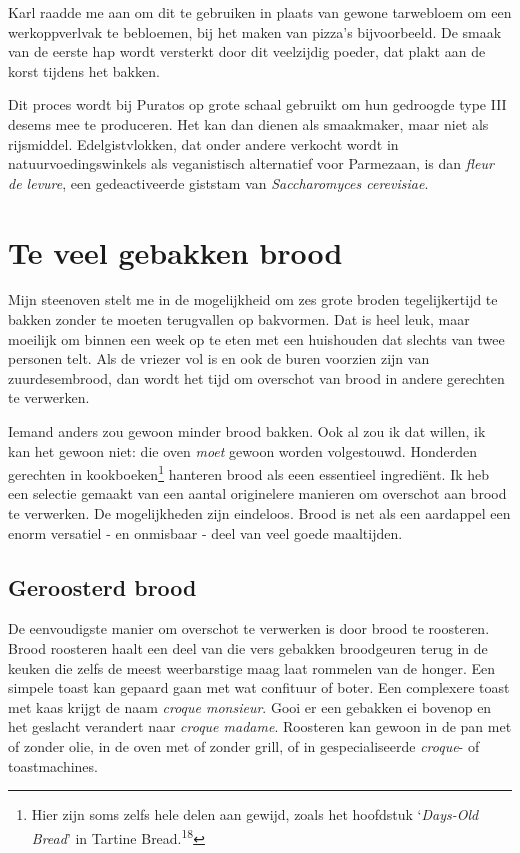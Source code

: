 \documentclass[
  11pt,
  dutch,
]{memoir}
\begin{document}
Karl raadde me aan om dit te gebruiken in plaats van gewone tarwebloem
om een werkoppverlvak te bebloemen, bij het maken van pizza's
bijvoorbeeld. De smaak van de eerste hap wordt versterkt door dit
veelzijdig poeder, dat plakt aan de korst tijdens het bakken.

Dit proces wordt bij Puratos op grote schaal gebruikt om hun gedroogde
type III desems mee te produceren. Het kan dan dienen als smaakmaker,
maar niet als rijsmiddel. Edelgistvlokken, dat onder andere verkocht
wordt in natuurvoedingswinkels als veganistisch alternatief voor
Parmezaan, is dan \emph{fleur de levure}, een gedeactiveerde giststam
van \emph{Saccharomyces cerevisiae}.

\hypertarget{te-veel-gebakken-brood}{%
\section{Te veel gebakken brood}\label{te-veel-gebakken-brood}}

Mijn steenoven stelt me in de mogelijkheid om zes grote broden
tegelijkertijd te bakken zonder te moeten terugvallen op bakvormen. Dat
is heel leuk, maar moeilijk om binnen een week op te eten met een
huishouden dat slechts van twee personen telt. Als de vriezer vol is en
ook de buren voorzien zijn van zuurdesembrood, dan wordt het tijd om
overschot van brood in andere gerechten te verwerken.

Iemand anders zou gewoon minder brood bakken. Ook al zou ik dat willen,
ik kan het gewoon niet: die oven \emph{moet} gewoon worden volgestouwd.
Honderden gerechten in kookboeken\footnote{Hier zijn soms zelfs hele
  delen aan gewijd, zoals het hoofdstuk `\emph{Days-Old Bread}' in
  Tartine Bread.\textsuperscript{18}} hanteren brood als eeen essentieel
ingrediënt. Ik heb een selectie gemaakt van een aantal originelere
manieren om overschot aan brood te verwerken. De mogelijkheden zijn
eindeloos. Brood is net als een aardappel een enorm versatiel - en
onmisbaar - deel van veel goede maaltijden.

\hypertarget{geroosterd-brood}{%
\subsection{Geroosterd brood}\label{geroosterd-brood}}

De eenvoudigste manier om overschot te verwerken is door brood te
roosteren. Brood roosteren haalt een deel van die vers gebakken
broodgeuren terug in de keuken die zelfs de meest weerbarstige maag laat
rommelen van de honger. Een simpele toast kan gepaard gaan met wat
confituur of boter. Een complexere toast met kaas krijgt de naam
\emph{croque monsieur}. Gooi er een gebakken ei bovenop en het geslacht
verandert naar \emph{croque madame}. Roosteren kan gewoon in de pan met
of zonder olie, in de oven met of zonder grill, of in gespecialiseerde
\emph{croque}- of toastmachines.
\end{document}
